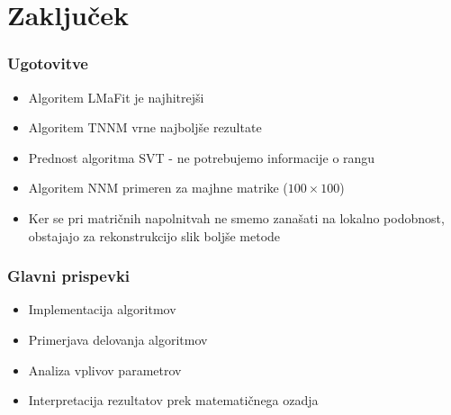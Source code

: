 \documentclass{beamer}
\begin{document}
\section{Zaključek}

\begin{frame}
  \frametitle{Ugotovitve}
  \begin{itemize}
    \item Algoritem LMaFit je najhitrejši
    \item Algoritem TNNM vrne najboljše rezultate
    \item Prednost algoritma SVT - ne potrebujemo informacije o rangu
    \item Algoritem NNM primeren za majhne matrike ($100 \times 100$)
    \item Ker se pri matričnih napolnitvah ne smemo zanašati na lokalno podobnost, obstajajo za rekonstrukcijo slik boljše metode
  \end{itemize}
\end{frame}


\begin{frame}
  \frametitle{Glavni prispevki}
  \begin{itemize}
    \item Implementacija algoritmov
    \item Primerjava delovanja algoritmov 
    \item Analiza vplivov parametrov
    \item Interpretacija rezultatov prek matematičnega ozadja
  \end{itemize}
\end{frame}
\end{document}
